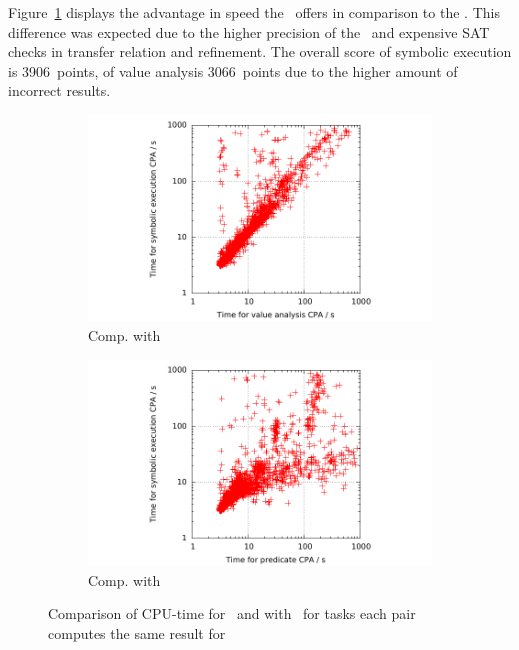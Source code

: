 Figure~\ref{fig:valCputime} displays the advantage in speed the \ offers in comparison to the \symbolicExecutionCPA.
This difference was expected due to the higher precision of the \symbolicExecutionCPA\ and expensive SAT checks in transfer relation and refinement.
The overall score of symbolic execution is 3906~points, of value analysis 3066~points due to the higher amount of incorrect results.

\begin{figure}
\centering
\begin{subfigure}[b]{.48\textwidth}
\includegraphics[trim=2cm 0 1cm 0, clip=true, scale=0.9]{evaluation/sp_cputime_VA_symEx}
\caption{Comp. with }
\label{fig:valCputime}
\end{subfigure}
\begin{subfigure}[b]{.48\textwidth}
\includegraphics[trim=2cm 0 1cm 0, clip=true, scale=0.9]{evaluation/sp_cputime_pred_symEx}
\caption{Comp. with \predicateCPA}
\label{fig:predCputime}
\end{subfigure}
\caption{Comparison of CPU-time for \ and \predicateCPA with \symbolicExecutionCPA\ for tasks each pair computes the same result for}
\end{figure}

